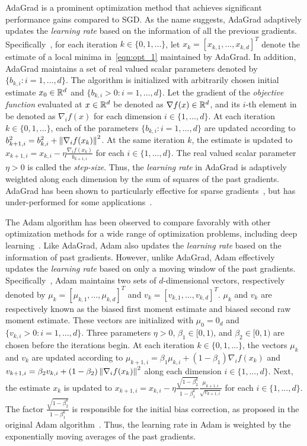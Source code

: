 AdaGrad is a prominent optimization method that achieves significant performance gains compared to SGD. As the name suggests, AdaGrad adaptively updates the {\em learning rate} based on the information of all the previous gradients. Specifically~\cite{duchi2011adaptive}, for each iteration $k \in \{0,1,\ldots\}$, let $x_k = [x_{k,1},\ldots,x_{k,d}]^T$ denote the estimate of a local minima in~\eqref{eqn:opt_1} maintained by AdaGrad. In addition, AdaGrad maintains a set of real valued scalar parameters denoted by $\{b_{k,i}: i=1,\ldots,d\}$. The algorithm is initialized with arbitrarily chosen initial estimate $x_0 \in \mathbb{R}^d$ and $\{b_{k,i} > 0: i=1,\ldots,d\}$. Let the gradient of the {\em objective function} evaluated at $x \in \mathbb{R}^d$ be denoted as $\nabla f(x) \in \mathbb{R}^d$, and its $i$-th element in be denoted as $\nabla_i f(x)$ for each dimension $i \in  \{1,\ldots,d\}$. At each iteration $k \in \{0,1,\ldots\}$, each of the parameters $\{b_{k,i}: i=1,\ldots,d\}$ are updated according to $b_{k+1,i}^2 = b_{k,i}^2 + \left\lVert\nabla_i f(x_k)\right\rVert ^2$. At the same iteration $k$, the estimate is updated to $x_{k+1,i} = x_{k,i} - \eta \frac{\nabla_i f(x_k)}{b_{k+1,i}}$ for each $i \in  \{1,\ldots,d\}$. The real valued scalar parameter $\eta > 0$ is called the {\em step-size}. Thus, the {\em learning rate} in AdaGrad is adaptively weighted along each dimension by the sum of squares of the past gradients. AdaGrad has been shown to particularly effective for sparse gradients~\cite{NIPS2013_2812e5cf}, but has under-performed for some applications~\cite{wilson2017marginal}.

The Adam algorithm has been observed to compare favorably with other optimization methods for a wide range of optimization problems, including deep learning~\cite{radford2015unsupervised, peters2018deep, wu2016google}. Like AdaGrad, Adam also updates the {\em learning rate} based on the information of past gradients. However, unlike AdaGrad, Adam effectively updates the {\em learning rate} based on only a moving window of the past gradients. Specifically~\cite{kingma2014adam}, Adam maintains two sets of $d$-dimensional vectors, respectively denoted by $\mu_k = [\mu_{k,1},\ldots,\mu_{k,d}]^T$ and $v_k = [v_{k,1},\ldots,v_{k,d}]^T$. $\mu_k$ and $v_k$ are respectively known as the biased first moment estimate and biased second raw moment estimate. These vectors are initialized with $\mu_0 = 0_d$ and $\{v_{k,i} > 0: i=1,\ldots,d\}$. Three parameters $\eta > 0$, $\beta_1 \in [0,1)$, and $\beta_2 \in [0,1)$ are chosen before the iterations begin. At each iteration $k \in \{0,1,\ldots\}$, the vectors $\mu_k$ and $v_k$ are updated according to $\mu_{k+1,i} = \beta_1 \mu_{k,i} + (1-\beta_1) \nabla_i f(x_k)$ and $v_{k+1,i} = \beta_2 v_{k,i} + (1-\beta_2) \left\lVert\nabla_i f(x_k)\right\rVert ^2$ along each dimension $i \in  \{1,\ldots,d\}$. Next, the estimate $x_k$ is updated to $x_{k+1,i} = x_{k,i} - \eta \frac{\sqrt{1-\beta_2^k}}{1-\beta_1^k} \frac{\mu_{k+1,i}}{\sqrt{v_{k+1,i}}}$ for each $i \in  \{1,\ldots,d\}$. The factor $\frac{\sqrt{1-\beta_2^k}}{1-\beta_1^k}$ is responsible for the initial bias correction, as proposed in the original Adam algorithm~\cite{kingma2014adam}.  Thus, the learning rate in Adam is weighted by the exponentially moving averages of the past gradients.

